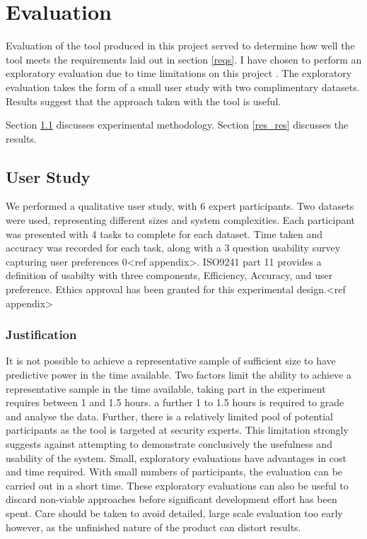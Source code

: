 \chapter{Evaluation}\label{eval}

Evaluation of the tool produced in this project served to determine how well the tool meets the requirements laid out in section \ref{reqs}. I have chosen to perform an exploratory evaluation due to time limitations on this project \cite{Ellis:2006:EAU:1168149.1168152}. The exploratory evaluation takes the form of a small user study with two complimentary datasets. Results suggest that the approach taken with the tool is useful. 

Section \ref{res_study} discusses experimental methodology. Section \ref{res_res} discusses the results. 

\section{User Study}\label{res_study}

We performed a qualitative user study, with 6 expert participants. Two datasets were used, representing different sizes and system complexities. Each participant was presented with 4 tasks to complete for each dataset. Time taken and accuracy was recorded for each task, along with a 3 question usability survey capturing user preferences 0<ref appendix>. ISO9241 part 11 \cite{iso9241} provides a definition of usabilty with three components, Efficiency, Accuracy, and user preference. 
Ethics approval has been granted for this experimental design.<ref appendix> 

\subsection{Justification}
It is not possible to achieve a representative sample of sufficient size to have predictive power in the time available. Two factors limit the ability to achieve a representative sample in the time available, taking part in the experiment requires between 1 and 1.5 hours. a further 1 to 1.5 hours is required to grade and analyse the data. Further, there is a relatively limited pool of potential participants as the tool is targeted at security experts. This limitation strongly suggests against attempting to demonstrate conclusively the usefulness and usability of the system. Small, exploratory evaluations have advantages in cost and time required. With small numbers of participants, the evaluation can be carried out in a short time. These exploratory evaluations can also be useful to discard non-viable approaches before significant development effort has been spent. Care should be taken to avoid detailed, large scale evaluation too early however, as the unfinished nature of the product can distort results. 


